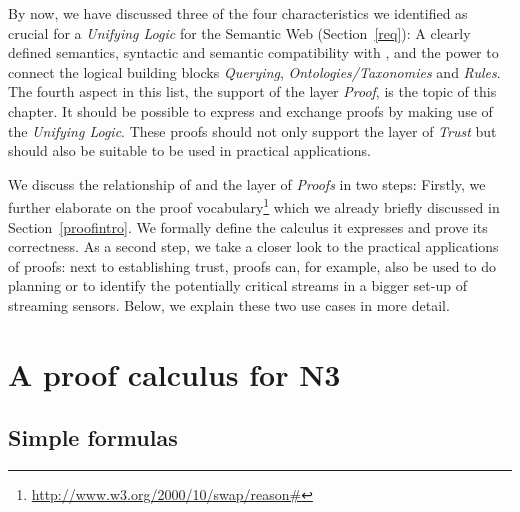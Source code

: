 By now, we have discussed three of the four characteristics we identified as crucial for a \emph{Unifying Logic} for the Semantic Web (Section~\ref{req}): 
A clearly defined semantics, 
syntactic and semantic compatibility with \rdf, and the power to connect the logical building blocks \emph{Querying}, \emph{Ontologies/Taxonomies} and \emph{Rules}. 
The fourth aspect in this list, the support of the layer \emph{Proof}, is the topic of this chapter. It should be possible to express and exchange proofs
 by making use of the \emph{Unifying Logic}. %
These proofs should not only support the layer of \emph{Trust} but should also be suitable to be used in practical applications.  

We discuss the relationship of \nthreelogic and the layer of \emph{Proofs} in two steps: Firstly, 
we further elaborate on the proof vocabulary\footnote{\url{http://www.w3.org/2000/10/swap/reason\#}} which we already briefly discussed in Section~\ref{proofintro}. 
We formally define the calculus it expresses and prove its correctness. As a second step, we take a closer look to the practical applications of proofs: next to establishing 
trust, proofs can, for example, also be used to do planning or to identify the potentially critical streams in a bigger set-up of streaming sensors. 
Below, we explain these two use cases in more detail.



\section{A proof calculus for N3}
\label{nthree}
\subsection{Simple formulas}

